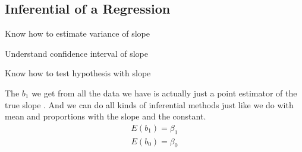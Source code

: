 \subsection{Inferential of a Regression}
\begin{objectives}
    \item Know how to estimate variance of slope
    \item Understand confidence interval of slope
    \item Know how to test hypothesis with slope
\end{objectives}
\vbox{}
The \(b_1\) we get from all the data we have is actually just a point estimator of the true slope . And we can do all kinds of inferential methods just like we do with mean and proportions with the slope and the constant.
\begin{align}
    E(b_1)=\beta_1\\
    E(b_0)=\beta_0    
\end{align}

